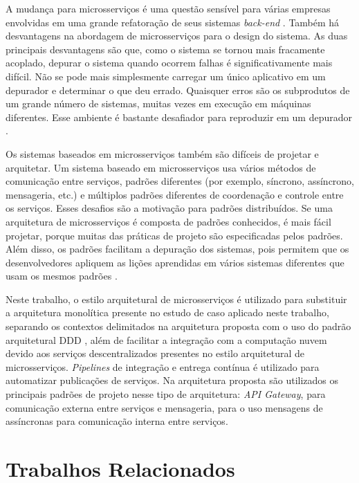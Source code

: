 
A mudança para microsserviços é uma questão sensível para várias empresas envolvidas em uma grande refatoração de seus sistemas \textit{back-end} \cite{Dragoni2016}. Também há desvantagens na abordagem de microsserviços para o design do sistema. As duas principais desvantagens são que, como o sistema se tornou mais fracamente acoplado, depurar o sistema quando ocorrem falhas é significativamente mais difícil. Não se pode mais simplesmente carregar um único aplicativo em um depurador e determinar o que deu errado. Quaisquer erros são os subprodutos de um grande número de sistemas, muitas vezes em execução em máquinas diferentes. Esse ambiente é bastante desafiador para reproduzir em um depurador \cite{Burns2018DesigningServices}.

Os sistemas baseados em microsserviços também são difíceis de projetar e arquitetar. Um sistema baseado em microsserviços usa vários métodos de comunicação entre serviços, padrões diferentes (por exemplo, síncrono, assíncrono, mensageria, etc.) e múltiplos padrões diferentes de coordenação e controle entre os serviços. Esses desafios são a motivação para padrões distribuídos. Se uma arquitetura de microsserviços é composta de padrões conhecidos, é mais fácil projetar, porque muitas das práticas de projeto são especificadas pelos padrões. Além disso, os padrões facilitam a depuração dos sistemas, pois permitem que os desenvolvedores apliquem as lições aprendidas em vários sistemas diferentes que usam os mesmos padrões \cite{Burns2018DesigningServices}.

Neste trabalho, o estilo arquitetural de microsserviços é utilizado para substituir a arquitetura monolítica presente no estudo de caso aplicado neste trabalho, separando os contextos delimitados na arquitetura proposta com o uso do padrão arquitetural \acrfull{DDD} \cite{Richardson2016}, além de facilitar a integração com a computação nuvem devido aos serviços descentralizados presentes no estilo arquitetural de microsserviços. \textit{Pipelines} de integração e entrega contínua \cite{Dragoni2016} é utilizado para automatizar publicações de serviços. Na arquitetura proposta são utilizados os principais padrões de projeto nesse tipo de arquitetura: \textit{API Gateway}, para comunicação externa entre serviços e mensageria, para o uso mensagens de assíncronas para comunicação interna entre serviços.

\section{Trabalhos Relacionados}
\label{sec:trabalhos-relacionados}

